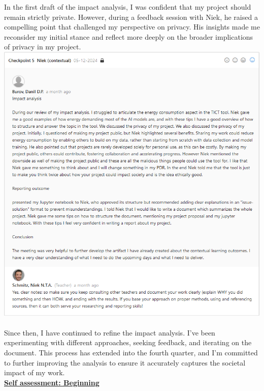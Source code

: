 \documentclass{article}
\begin{document}
	In the first draft of the impact analysis, I was confident that my project should remain strictly private. However, during a feedback session with Niek, he raised a compelling point that challenged my perspective on privacy. His insights made me reconsider my initial stance and reflect more deeply on the broader implications of privacy in my project.\\
  \includegraphics[width=\textwidth]{images/Feedback_Niek_2.png}\\\\
	Since then, I have continued to refine the impact analysis. I’ve been experimenting with different approaches, seeking feedback, and iterating on the document. This process has extended into the fourth quarter, and I’m committed to further improving the analysis to ensure it accurately captures the societal impact of my work.\\
	  \underline{\textbf{Self assessment: Beginning}}
\end{document}
